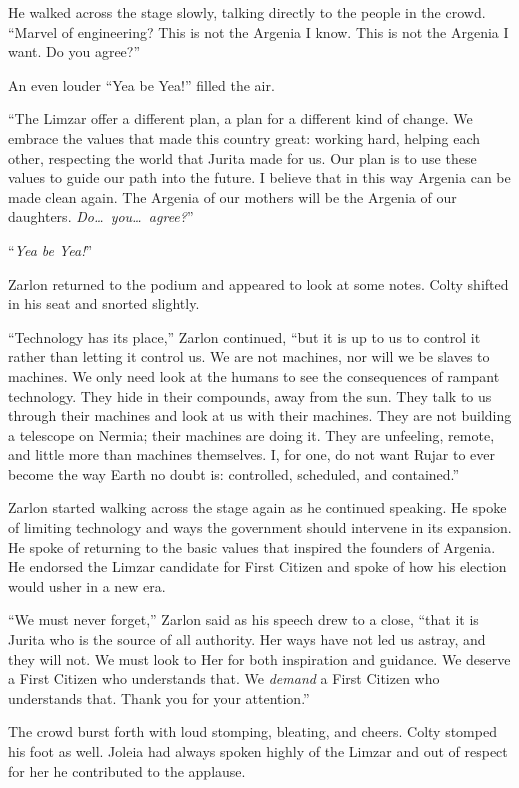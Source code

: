 He walked across the stage slowly, talking directly to the people in the crowd. ``Marvel of
engineering? This is not the Argenia I know. This is not the Argenia I want. Do you agree?''

An even louder ``Yea be Yea!'' filled the air.

``The Limzar offer a different plan, a plan for a different kind of change. We embrace the
values that made this country great: working hard, helping each other, respecting the world that
Jurita made for us. Our plan is to use these values to guide our path into the future. I believe
that in this way Argenia can be made clean again. The Argenia of our mothers will be the Argenia
of our daughters. \emph{Do\ldots\ you\ldots\ agree?}''

``\emph{Yea be Yea!}''

Zarlon returned to the podium and appeared to look at some notes. Colty shifted in his seat and
snorted slightly.

``Technology has its place,'' Zarlon continued, ``but it is up to us to control it rather than
letting it control us. We are not machines, nor will we be slaves to machines. We only need look
at the humans to see the consequences of rampant technology. They hide in their compounds, away
from the sun. They talk to us through their machines and look at us with their machines. They
are not building a telescope on Nermia; their machines are doing it. They are unfeeling, remote,
and little more than machines themselves. I, for one, do not want Rujar to ever become the way
Earth no doubt is: controlled, scheduled, and contained.''

Zarlon started walking across the stage again as he continued speaking. He spoke of limiting
technology and ways the government should intervene in its expansion. He spoke of returning to
the basic values that inspired the founders of Argenia. He endorsed the Limzar candidate for
First Citizen and spoke of how his election would usher in a new era.

``We must never forget,'' Zarlon said as his speech drew to a close, ``that it is Jurita who is
the source of all authority. Her ways have not led us astray, and they will not. We must look to
Her for both inspiration and guidance. We deserve a First Citizen who understands that. We
\emph{demand} a First Citizen who understands that. Thank you for your attention.''

The crowd burst forth with loud stomping, bleating, and cheers. Colty stomped his foot as well.
Joleia had always spoken highly of the Limzar and out of respect for her he contributed to the
applause.
